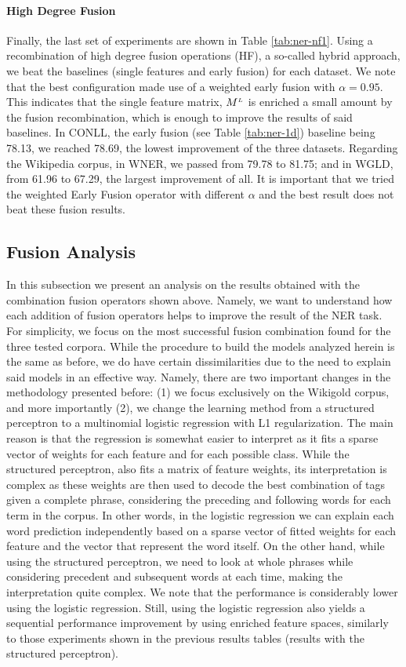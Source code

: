            
           
\paragraph{High Degree Fusion}
Finally, the last set of experiments are shown in Table \ref{tab:ner-nf1}. Using a recombination of high degree fusion operations (HF), a so-called hybrid approach, we  beat the baselines (single features and early fusion) for each dataset. We note that the best configuration made use of a weighted early fusion with $\alpha=0.95$. This indicates that the single feature matrix, $M^{\scriptscriptstyle L}$ is enriched a small amount by the fusion recombination, which is enough to improve the results of said baselines. In CONLL, the early fusion (see Table \ref{tab:ner-1d}) baseline being 78.13, we reached 78.69, the lowest improvement of the three datasets. Regarding the Wikipedia corpus, in WNER, we passed from 79.78 to 81.75; and in WGLD, from 61.96 to 67.29, the largest improvement of all. It is important that we tried the weighted Early Fusion operator with different $\alpha$ and the best result does not beat these fusion results.

\subsection{Fusion Analysis}
In this subsection we present an analysis on the results obtained with the combination fusion operators shown  above. Namely, we want to understand how each addition of fusion operators helps to improve the result of the NER task. For simplicity,  we focus on the most successful fusion combination found for the three tested corpora. While the procedure to build the models analyzed herein is the same as before, we do have certain dissimilarities due to the need to explain said models in an effective way. Namely, there are two important changes in the methodology presented before: (1) we focus exclusively on the Wikigold corpus, and more importantly (2), we change the learning method from a structured perceptron to a multinomial logistic regression with L1 regularization. The main reason is that the regression is somewhat easier to interpret as it fits a sparse vector of weights for each feature and for each possible class. While the structured perceptron, also fits a matrix of feature weights, its interpretation is complex as these weights are then used to decode the best combination of tags given a complete phrase, considering the preceding and following words for each term in the corpus. In other words, in the logistic regression we can explain each word prediction independently based on a sparse vector of fitted weights for each feature and the vector that represent the word itself. On the other hand, while using the structured perceptron, we need to look at whole phrases  while considering precedent and subsequent words at each time, making the interpretation quite complex. We note that the performance is considerably lower using the logistic regression. Still, using the logistic regression also yields a sequential performance improvement  by using enriched feature spaces, similarly to those experiments shown in the previous results tables (results with the structured perceptron).

